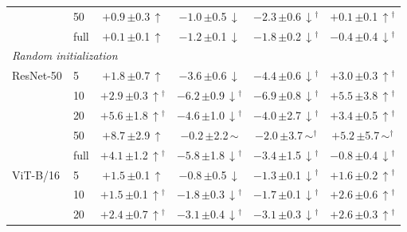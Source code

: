 \begin{table}[htbp]
\begin{tabular}{llcccc}
 & 50 & $+0.9$\,{\scriptsize$\pm$0.3}\,$\uparrow$ & $-1.0$\,{\scriptsize$\pm$0.5}\,$\downarrow$ & $-2.3$\,{\scriptsize$\pm$0.6}\,$\downarrow$$^\dagger$ & $+0.1$\,{\scriptsize$\pm$0.1}\,$\uparrow$$^\dagger$ \\
 & full & $+0.1$\,{\scriptsize$\pm$0.1}\,$\uparrow$ & $-1.2$\,{\scriptsize$\pm$0.1}\,$\downarrow$ & $-1.8$\,{\scriptsize$\pm$0.2}\,$\downarrow$$^\dagger$ & $-0.4$\,{\scriptsize$\pm$0.4}\,$\downarrow$$^\dagger$ \\
\midrule
\multicolumn{6}{l}{\textit{Random initialization}} \\
ResNet-50 & 5 & $+1.8$\,{\scriptsize$\pm$0.7}\,$\uparrow$ & $-3.6$\,{\scriptsize$\pm$0.6}\,$\downarrow$ & $-4.4$\,{\scriptsize$\pm$0.6}\,$\downarrow$$^\dagger$ & $+3.0$\,{\scriptsize$\pm$0.3}\,$\uparrow$$^\dagger$ \\
 & 10 & $+2.9$\,{\scriptsize$\pm$0.3}\,$\uparrow$$^\dagger$ & $-6.2$\,{\scriptsize$\pm$0.9}\,$\downarrow$$^\dagger$ & $-6.9$\,{\scriptsize$\pm$0.8}\,$\downarrow$$^\dagger$ & $+5.5$\,{\scriptsize$\pm$3.8}\,$\uparrow$$^\dagger$ \\
 & 20 & $+5.6$\,{\scriptsize$\pm$1.8}\,$\uparrow$$^\dagger$ & $-4.6$\,{\scriptsize$\pm$1.0}\,$\downarrow$$^\dagger$ & $-4.0$\,{\scriptsize$\pm$2.7}\,$\downarrow$$^\dagger$ & $+3.4$\,{\scriptsize$\pm$0.5}\,$\uparrow$$^\dagger$ \\
 & 50 & $+8.7$\,{\scriptsize$\pm$2.9}\,$\uparrow$ & $-0.2$\,{\scriptsize$\pm$2.2}\,$\sim$ & $-2.0$\,{\scriptsize$\pm$3.7}\,$\sim$$^\dagger$ & $+5.2$\,{\scriptsize$\pm$5.7}\,$\sim$$^\dagger$ \\
 & full & $+4.1$\,{\scriptsize$\pm$1.2}\,$\uparrow$$^\dagger$ & $-5.8$\,{\scriptsize$\pm$1.8}\,$\downarrow$$^\dagger$ & $-3.4$\,{\scriptsize$\pm$1.5}\,$\downarrow$$^\dagger$ & $-0.8$\,{\scriptsize$\pm$0.4}\,$\downarrow$$^\dagger$ \\
\addlinespace[2pt]
ViT-B/16 & 5 & $+1.5$\,{\scriptsize$\pm$0.1}\,$\uparrow$ & $-0.8$\,{\scriptsize$\pm$0.5}\,$\downarrow$ & $-1.3$\,{\scriptsize$\pm$0.1}\,$\downarrow$$^\dagger$ & $+1.6$\,{\scriptsize$\pm$0.2}\,$\uparrow$$^\dagger$ \\
 & 10 & $+1.5$\,{\scriptsize$\pm$0.1}\,$\uparrow$$^\dagger$ & $-1.8$\,{\scriptsize$\pm$0.3}\,$\downarrow$$^\dagger$ & $-1.7$\,{\scriptsize$\pm$0.1}\,$\downarrow$$^\dagger$ & $+2.6$\,{\scriptsize$\pm$0.6}\,$\uparrow$$^\dagger$ \\
 & 20 & $+2.4$\,{\scriptsize$\pm$0.7}\,$\uparrow$$^\dagger$ & $-3.1$\,{\scriptsize$\pm$0.4}\,$\downarrow$$^\dagger$ & $-3.1$\,{\scriptsize$\pm$0.3}\,$\downarrow$$^\dagger$ & $+2.6$\,{\scriptsize$\pm$0.3}\,$\uparrow$$^\dagger$ \\

\end{tabular}
\end{table}

